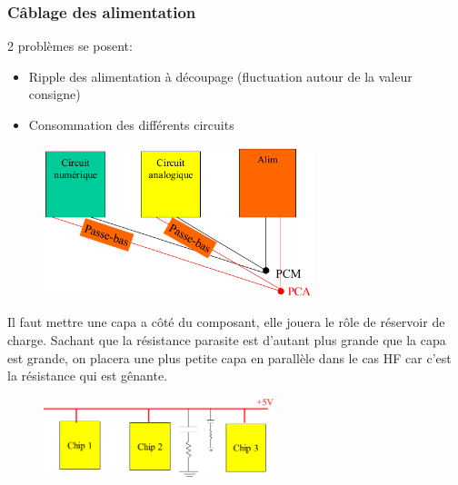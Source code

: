\subsubsection{Câblage des alimentation}
2 problèmes se posent:
\begin{itemize}
	\item Ripple des alimentation à découpage (fluctuation autour de la valeur consigne)
	\item Consommation des différents circuits
\end{itemize}
\begin{figure}[H] 
	\centering 
	\includegraphics[width=0.7\textwidth,height=10\baselineskip,keepaspectratio]{ch3/image33}  
\end{figure}
Il faut mettre une capa a côté du composant, elle jouera le rôle de réservoir de charge. Sachant que la résistance parasite est d'autant plus grande que la capa est grande, on placera une plus petite capa en parallèle dans le cas HF car c'est la résistance qui est gênante.
\begin{figure}[H] 
	\centering 
	\includegraphics[width=0.6\textwidth,height=10\baselineskip,keepaspectratio]{ch3/image34}  
\end{figure}